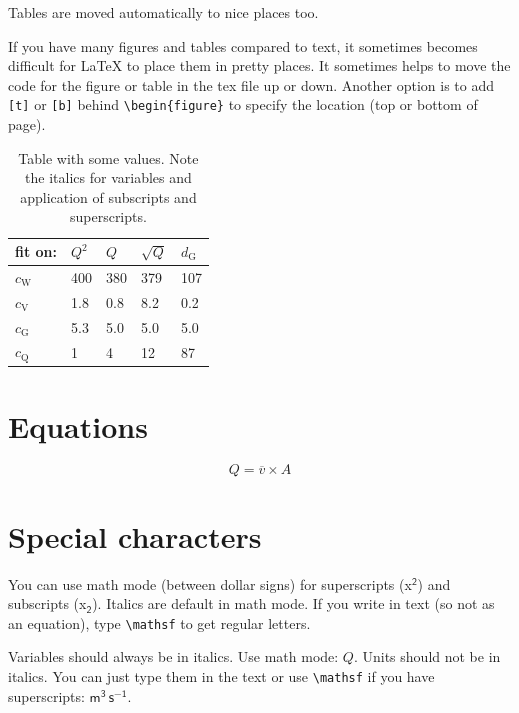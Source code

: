 \documentclass[twocolumn, 10pt, a4paper]{article}
\begin{document}
Tables are moved automatically to nice places too. 

If you have many figures and tables compared to text, it sometimes becomes difficult for LaTeX to place them in pretty places. It sometimes helps to move the code for the figure or table in the tex file up or down. Another option is to add \verb|[t]| or \verb|[b]| behind \verb|\begin{figure}| to specify the location (top or bottom of page).


\begin{table}[b]
	\caption{Table with some values. Note the italics for variables and application of subscripts and superscripts.}
	\label{tab: testtable}
	\centering
	\begin{tabular}{lllll}
		\hline
		fit on:&$Q^2$&$Q$&$\sqrt{Q}$&$d_\mathrm{G}$\\
		\hline
		$c_\mathrm{W}$&400&380&379&107\\
		$c_\mathrm{V}$&1.8&0.8&8.2&0.2\\
		$c_\mathrm{G}$&5.3&5.0&5.0&5.0\\
		$c_\mathrm{Q}$&1&4&12&87\\
		\hline
	\end{tabular}
\end{table} 



\section{Equations}

\begin{equation} 
\label{eq: testequation}
Q = \overline{v} \times A
\end{equation}



\section{Special characters}

You can use math mode (between dollar signs) for superscripts (x$^\mathsf{2}$) and subscripts (x$_\mathsf{2}$). Italics are default in math mode. If you write in text (so not as an equation), type \verb|\mathsf| to get regular letters.

Variables should always be in italics. Use math mode: $Q$. Units should not be in italics. You can just type them in the text or use \verb|\mathsf| if you have superscripts: $\mathsf{m^{3}\,s^{-1}}$.
\end{document}
